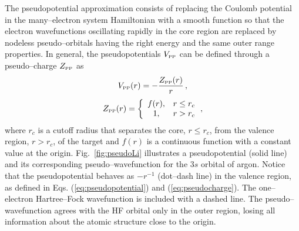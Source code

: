 \documentclass[10pt]{article}
\begin{document}
The pseudopotential approximation consists of replacing the Coulomb 
potential in the many--electron system Hamiltonian with a smooth 
function so that the electron wavefunctions oscillating rapidly in 
the core region are replaced by nodeless pseudo--orbitals having the 
right energy and the same outer range properties.
In general, the pseudopotentials $V_{\mbox{\tiny PP}}$ can be defined 
through a pseudo--charge $Z_{\mbox{\tiny PP}}$ as
\begin{equation}
 V_{\mbox{\tiny PP}}(r)=-\frac{Z_{\mbox{\tiny PP}}(r)}{r} \,,
 \label{eq:pseudopotential}
\end{equation}
\begin{equation}
 Z_{\mbox{\tiny PP}}(r)=\bigg\{
 \begin{array}{cl}
  f(r), & r\leq r_c \\
  1, & r>r_c 
 \end{array} 
 \,,
 \label{eq:pseudocharge}
\end{equation}
where $r_c$ is a cutoff radius that separates the core, $r\leq r_c$,
from the valence region, $r>r_c$, of the target and $f(r)$ is a 
continuous function with a constant value at the origin.
Fig.~\ref{fig:pseudoLi} illustrates a pseudopotential (solid line)
and its corresponding pseudo--wavefunction for the $3s$ orbital of 
argon. Notice that the pseudopotential behaves as $-r^{-1}$ (dot--dash 
line) in the valence region, as defined in Eqs. (\ref{eq:pseudopotential})
and (\ref{eq:pseudocharge}).
The one--electron Hartree--Fock wavefunction is included
with a dashed line. The pseudo--wavefunction agrees with the 
HF orbital only in the outer region, losing all 
information about the atomic structure close to the origin.
\end{document}

